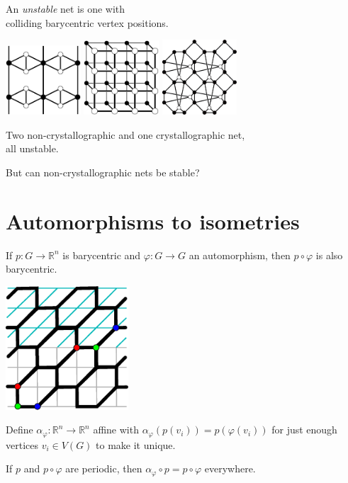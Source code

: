 \documentclass{beamer}
\begin{document}
\begin{frame}
  \begin{center}
    An {\em unstable} net is one with\\
    colliding barycentric vertex positions.

    \includegraphics[width=1.1in]{unstable}
    \quad
    \includegraphics[width=1.1in]{ladder}
    \quad
    \includegraphics[width=1.1in]{collision}

    Two non-crystallographic and one crystallographic net,\\
    all unstable.

    But can non-crystallographic nets be stable?
  \end{center}
\end{frame}


\section{Automorphisms to isometries}

\begin{frame}
  \begin{center}
    If $p\colon G \to \mathbb{R}^n$ is barycentric and $\varphi\colon G \to
    G$ an automorphism, then $p\circ\varphi$ is also barycentric.

    \includegraphics[width=1.8in]{affine}

    Define $\alpha_\varphi\colon \mathbb{R}^n \to \mathbb{R}^n$ affine with
    $\alpha_\varphi(p(v_i)) = p(\varphi(v_i))$ for just enough vertices
    $v_i\in V(G)$ to make it unique.

    If $p$ and $p\circ\varphi$ are periodic, then $\alpha_\varphi\circ p =
    p\circ\varphi$ everywhere.
  \end{center}
\end{frame}
\end{document}
